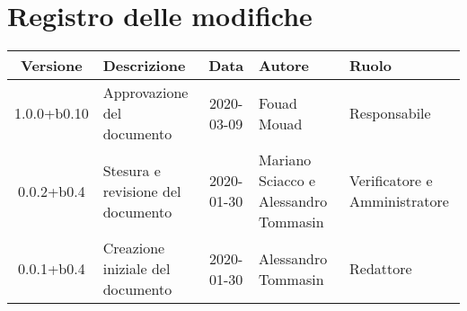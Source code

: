\section*{Registro delle modifiche}

\begin{center}
	\begin{longtable}{|c|p{3.5cm}|c|p{3cm}|p{3cm}|}
	\hline
	\rowcolor{lighter-grayer}
	\textbf{Versione} & \textbf{Descrizione} & \textbf{Data} & \textbf{Autore} & \textbf{Ruolo} \\
	\hline
	\endfirsthead


	1.0.0+b0.10 & Approvazione del documento & 2020-03-09 & Fouad Mouad & Responsabile \\
	\hline
	0.0.2+b0.4 & Stesura e revisione del documento & 2020-01-30 & Mariano Sciacco e Alessandro Tommasin & Verificatore e Amministratore \\
	\hline
	0.0.1+b0.4 & Creazione iniziale del documento & 2020-01-30 & Alessandro Tommasin & Redattore \\
	\hline

	\end{longtable}
\end{center}